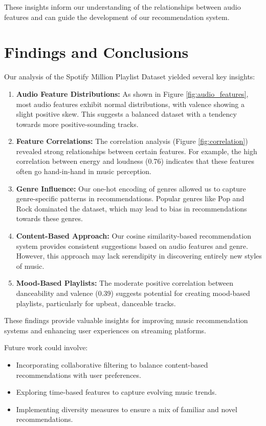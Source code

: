\documentclass[runningheads]{llncs}
\begin{document}
These insights inform our understanding of the relationships between audio features and can guide the development of our recommendation system.

\section{Findings and Conclusions}

Our analysis of the Spotify Million Playlist Dataset yielded several key insights:

\begin{enumerate}
    \item \textbf{Audio Feature Distributions:} As shown in Figure \ref{fig:audio_features}, most audio features exhibit normal distributions, with valence showing a slight positive skew. This suggests a balanced dataset with a tendency towards more positive-sounding tracks.
    
    \item \textbf{Feature Correlations:} The correlation analysis (Figure \ref{fig:correlation}) revealed strong relationships between certain features. For example, the high correlation between energy and loudness (0.76) indicates that these features often go hand-in-hand in music perception.
    
    \item \textbf{Genre Influence:} Our one-hot encoding of genres allowed us to capture genre-specific patterns in recommendations. Popular genres like Pop and Rock dominated the dataset, which may lead to bias in recommendations towards these genres.
    
    \item \textbf{Content-Based Approach:} Our cosine similarity-based recommendation system provides consistent suggestions based on audio features and genre. However, this approach may lack serendipity in discovering entirely new styles of music.
    
    \item \textbf{Mood-Based Playlists:} The moderate positive correlation between danceability and valence (0.39) suggests potential for creating mood-based playlists, particularly for upbeat, danceable tracks.
\end{enumerate}

These findings provide valuable insights for improving music recommendation systems and enhancing user experiences on streaming platforms.

Future work could involve:
\begin{itemize}
    \item Incorporating collaborative filtering to balance content-based recommendations with user preferences.
    \item Exploring time-based features to capture evolving music trends.
    \item Implementing diversity measures to ensure a mix of familiar and novel recommendations.
\end{itemize}
\end{document}
